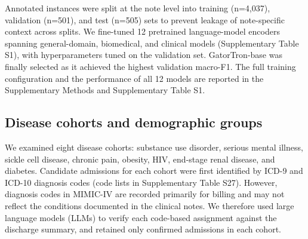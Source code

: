 \documentclass[unnumsec,webpdf,contemporary,large]{oup-authoring-template}
\newcommand{\td}[1]{\sethlcolor{pink}\hl{[Ting: #1]}}
\newcommand{\hy}[1]{\sethlcolor{yellow}\hl{[HY: #1]}}
\begin{document}
Annotated instances were split at the note level into training (n=4,037), validation (n=501), and test (n=505) sets to prevent leakage of note-specific context across splits. 
We fine-tuned 12 pretrained language-model encoders spanning general-domain, biomedical, and clinical models (Supplementary Table S1), with hyperparameters tuned on the validation set. %
GatorTron-base\cite{yang2022} was finally selected as it achieved the highest validation macro-F1. The full training configuration and the performance of all 12 models are reported in the Supplementary Methods and Supplementary Table S1. %

\subsection{Disease cohorts and demographic groups}
We examined eight disease cohorts: substance use disorder, serious mental illness, sickle cell disease, chronic pain, obesity, HIV, end-stage renal disease, and diabetes. Candidate admissions for each cohort were first identified by ICD-9 and ICD-10 diagnosis codes (code lists in Supplementary Table S27). However, diagnosis codes in MIMIC-IV are recorded primarily for billing and may not reflect the conditions documented in the clinical notes.\cite{omalley2005, shivade2014} We therefore used large language models (LLMs) to verify each code-based assignment against the discharge summary, and retained only confirmed admissions in each cohort.
\end{document}
